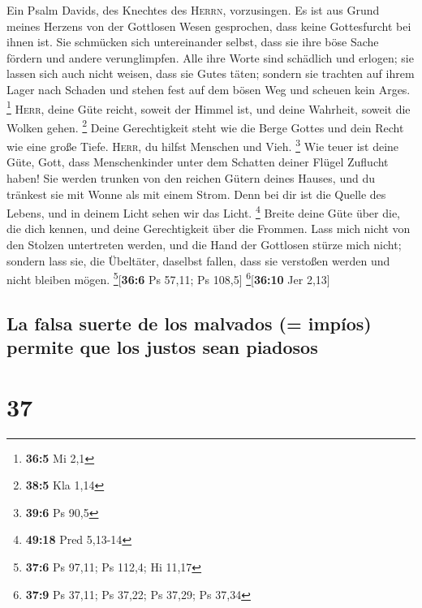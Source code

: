  Ein Psalm Davids, des Knechtes des \textsc{Herrn},
vorzusingen.  Es ist aus Grund meines Herzens von der
Gottlosen Wesen gesprochen, dass keine Gottesfurcht bei ihnen ist.
 Sie schmücken sich untereinander selbst, dass sie ihre
böse Sache fördern und andere verunglimpfen.  Alle ihre
Worte sind schädlich und erlogen; sie lassen sich auch nicht weisen,
dass sie Gutes täten;  sondern sie trachten auf ihrem
Lager nach Schaden und stehen fest auf dem bösen Weg und scheuen kein
Arges. \footnote{\textbf{36:5} Mi 2,1}  \textsc{Herr},
deine Güte reicht, soweit der Himmel ist, und deine Wahrheit, soweit die
Wolken gehen. \footnote{\textbf{38:5} Kla 1,14}  Deine
Gerechtigkeit steht wie die Berge Gottes und dein Recht wie eine große
Tiefe. \textsc{Herr}, du hilfst Menschen und Vieh. \footnote{\textbf{39:6}
  Ps 90,5}  Wie teuer ist deine Güte, Gott, dass
Menschenkinder unter dem Schatten deiner Flügel Zuflucht haben!
 Sie werden trunken von den reichen Gütern deines Hauses,
und du tränkest sie mit Wonne als mit einem Strom.  Denn
bei dir ist die Quelle des Lebens, und in deinem Licht sehen wir das
Licht. \footnote{\textbf{49:18} Pred 5,13-14}  Breite
deine Güte über die, die dich kennen, und deine Gerechtigkeit über die
Frommen.  Lass mich nicht von den Stolzen untertreten
werden, und die Hand der Gottlosen stürze mich nicht; 
sondern lass sie, die Übeltäter, daselbst fallen, dass sie verstoßen
werden und nicht bleiben mögen. \footnote{\textbf{37:6} Ps 97,11; Ps
  112,4; Hi 11,17}{[}\textbf{36:6} Ps 57,11; Ps 108,5{]}
\footnote{\textbf{37:9} Ps 37,11; Ps 37,22; Ps 37,29; Ps 37,34}{[}\textbf{36:10}
Jer 2,13{]}

\hypertarget{la-falsa-suerte-de-los-malvados-impuxedos-permite-que-los-justos-sean-piadosos}{%
\subsection{La falsa suerte de los malvados (= impíos) permite que los
justos sean
piadosos}\label{la-falsa-suerte-de-los-malvados-impuxedos-permite-que-los-justos-sean-piadosos}}

\hypertarget{section-36}{%
\section{37}\label{section-36}}

